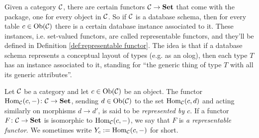 \documentclass[CT4S-EN-RU]{subfiles}
\begin{document}

\subsubsection{}\label{sec:representable functors}

Given a category $\mathcal{C}$, there are certain functors $\mathcal{C}\rightarrow{\bf Set}$ that come with the package, one for every object in $\mathcal{C}$. So if $\mathcal{C}$ is a database schema, then for every table $c\in\textnormal{Ob}(\mathcal{C})$ there is a certain database instance associated to it. These instances, i.e. set-valued functors, are called representable functors, and they'll be defined in Definition \ref{def:representable functor}. The idea is that if a database schema represents a conceptual layout of types (e.g. as an olog), then each type $T$ has an instance associated to it, standing for “the generic thing of type $T$ with all its generic attributes”.

\begin{definition}\label{def:representable functor}

Let $\mathcal{C}$ be a category and let $c\in\textnormal{Ob}(\mathcal{C})$ be an object. The functor $\textnormal{Hom}_\mathcal{C}(c,-)\colon\mathcal{C}\rightarrow{\bf Set}$, sending $d\in\textnormal{Ob}(\mathcal{C})$ to the set $\textnormal{Hom}_\mathcal{C}(c,d)$ and acting similarly on morphisms $d\to d'$, is said to be {\em represented by $c$}. If a functor $F\colon\mathcal{C}\rightarrow{\bf Set}$ is isomorphic to $\textnormal{Hom}_\mathcal{C}(c,-)$, we say that $F$ is {\em a representable functor}. We sometimes write $Y_c:=\textnormal{Hom}_\mathcal{C}(c,-)$ for short.

\end{definition}
\end{document}
